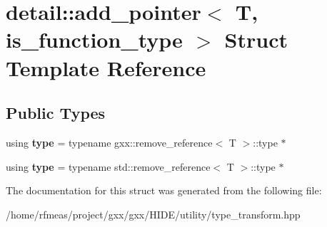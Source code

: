 \hypertarget{structdetail_1_1add__pointer}{}\section{detail\+:\+:add\+\_\+pointer$<$ T, is\+\_\+function\+\_\+type $>$ Struct Template Reference}
\label{structdetail_1_1add__pointer}
\subsection*{Public Types}
\begin{DoxyCompactItemize}
\item 
using {\bfseries type} = typename gxx\+::remove\+\_\+reference$<$ T $>$\+::type $\ast$\hypertarget{structdetail_1_1add__pointer_a21d5e84e30505b63adfd07e9d59f5e2f}{}\label{structdetail_1_1add__pointer_a21d5e84e30505b63adfd07e9d59f5e2f}

\item 
using {\bfseries type} = typename std\+::remove\+\_\+reference$<$ T $>$\+::type $\ast$\hypertarget{structdetail_1_1add__pointer_adf08c6927e6f476af74f6c2af89c9d1d}{}\label{structdetail_1_1add__pointer_adf08c6927e6f476af74f6c2af89c9d1d}

\end{DoxyCompactItemize}


The documentation for this struct was generated from the following file\+:\begin{DoxyCompactItemize}
\item 
/home/rfmeas/project/gxx/gxx/\+H\+I\+D\+E/utility/type\+\_\+transform.\+hpp\end{DoxyCompactItemize}
